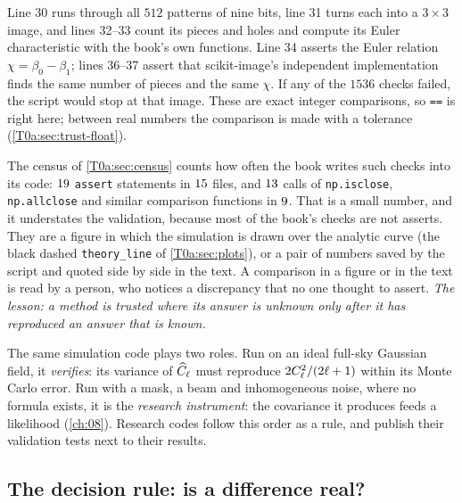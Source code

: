 
Line 30 runs through all $512$ patterns of nine bits, line 31 turns each into a $3\times3$ image, and lines 32--33 count its pieces and holes and compute its Euler characteristic with the book's own functions. Line 34 asserts the Euler relation $\chi=\beta_0-\beta_1$; lines 36--37 assert that scikit-image's independent implementation finds the same number of pieces and the same $\chi$. If any of the $1536$ checks failed, the script would stop at that image. These are exact integer comparisons, so \texttt{==} is right here; between real numbers the comparison is made with a tolerance (\cref{T0a:sec:trust-float}).

The census of \cref{T0a:sec:census} counts how often the book writes such checks into its code: $19$ \texttt{assert} statements in $15$ files, and $13$ calls of \texttt{np.isclose}, \texttt{np.allclose} and similar comparison functions in $9$. That is a small number, and it understates the validation, because most of the book's checks are not asserts. They are a figure in which the simulation is drawn over the analytic curve (the black dashed \texttt{theory\_line} of \cref{T0a:sec:plots}), or a pair of numbers saved by the script and quoted side by side in the text. A comparison in a figure or in the text is read by a person, who notices a discrepancy that no one thought to assert. \emph{The lesson: a method is trusted where its answer is unknown only after it has reproduced an answer that is known.}

\begin{inpractice}
The same simulation code plays two roles. Run on an ideal full-sky Gaussian field, it \emph{verifies}: its variance of $\widehat{C}_\ell$ must reproduce $2C_\ell^2/(2\ell+1)$ within its Monte Carlo error. Run with a mask, a beam and inhomogeneous noise, where no formula exists, it is the \emph{research instrument}: the covariance it produces feeds a likelihood (\cref{ch:08}). Research codes follow this order as a rule, and publish their validation tests next to their results.
\end{inpractice}

\subsection{The decision rule: is a difference real?}
\label{T0a:sec:trust-decide}

